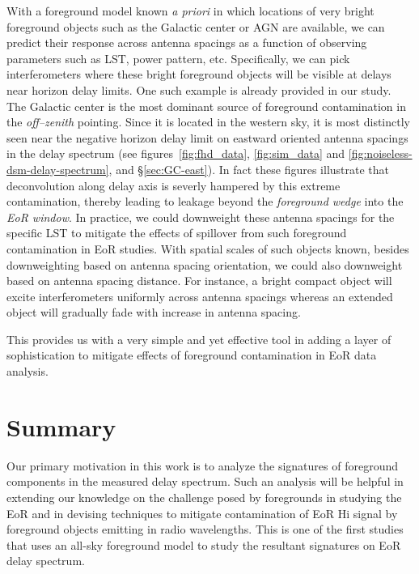 \documentclass[preprint2,iop,numberedappendix]{emulateapj}
\begin{document}
With a foreground model known {\it a priori} in which locations of very bright foreground objects such as the Galactic center or AGN are available, we can predict their response across antenna spacings as a function of observing parameters such as LST, power pattern, etc. Specifically, we can pick interferometers where these bright foreground objects will be visible at delays near horizon delay limits. One such example is already provided in our study. The Galactic center is the most dominant source of foreground contamination in the {\it off--zenith} pointing. Since it is located in the western sky, it is most distinctly seen near the negative horizon delay limit on eastward oriented antenna spacings in the delay spectrum (see figures~\ref{fig:fhd_data}, \ref{fig:sim_data} and \ref{fig:noiseless-dsm-delay-spectrum}, and \S\ref{sec:GC-east}). In fact these figures illustrate that deconvolution along delay axis is severly hampered by this extreme contamination, thereby leading to leakage beyond the {\it foreground wedge} into the {\it EoR window}. In practice, we could downweight these antenna spacings for the specific LST to mitigate the effects of spillover from such foreground contamination in EoR studies. With spatial scales of such objects known, besides downweighting based on antenna spacing orientation, we could also downweight based on antenna spacing distance. For instance, a bright compact object will excite interferometers uniformly across antenna spacings whereas an extended object will gradually fade with increase in antenna spacing. 

This provides us with a very simple and yet effective tool in adding a layer of sophistication to mitigate effects of foreground contamination in EoR data analysis. %


\section{Summary}\label{sec:summary}

Our primary motivation in this work is to analyze the signatures of foreground components in the measured delay spectrum. Such an analysis will be helpful in extending our knowledge on the challenge posed by foregrounds in studying the EoR and in devising techniques to mitigate contamination of EoR H{\sc i} signal by foreground objects emitting in radio wavelengths. This is one of the first studies that uses an all-sky foreground model to study the resultant signatures on EoR delay spectrum.
\end{document}

